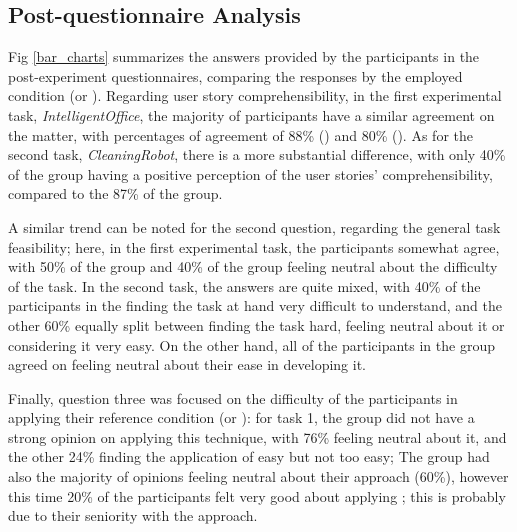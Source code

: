 \subsection{Post-questionnaire Analysis}
Fig \ref{bar_charts} summarizes the answers provided by the participants in the post-experiment questionnaires, comparing the responses by the employed condition (\tdd or \notdd).
Regarding user story comprehensibility, in the first experimental task, \textit{IntelligentOffice}, the majority of participants have a similar agreement on the matter, with percentages of agreement of 88\% (\tdd) and 80\% (\notdd). As for the second task, \textit{CleaningRobot}, there is a more substantial difference, with only 40\% of the \tdd group having a positive perception of the user stories' comprehensibility, compared to the 87\% of the \notdd group.

A similar trend can be noted for the second question, regarding the general task feasibility; here, in the first experimental task, the participants somewhat agree, with 50\% of the \tdd group and 40\% of the \notdd group feeling neutral about the difficulty of the task. In the second task, the answers are quite mixed, with 40\% of the participants in the \tdd finding the task at hand very difficult to understand, and the other 60\% equally split between finding the task hard, feeling neutral about it or considering it very easy.  On the other hand, all of the participants in the \notdd group agreed on feeling neutral about their ease in developing it.

Finally, question three was focused on the difficulty of the participants in applying their reference condition (\ie \tdd or \notdd): for task 1, the \tdd group did not have a strong opinion on applying this technique, with 76\% feeling neutral about it, and the other 24\% finding the application of \tdd easy but not too easy; The \notdd group had also the majority of opinions feeling neutral about their approach (60\%), however this time 20\% of the participants felt very good about applying \notdd; this is probably due to their seniority with the approach.


